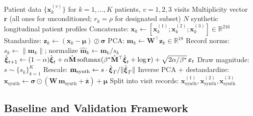 \begin{algorithm}[ht]
\caption{Multiplicity-Weighted SA for Longitudinal Patient Generation}
\label{alg:sa-pipeline}
\begin{algorithmic}[1]
\Require Patient data $\{\mathbf{x}_k^{(v)}\}$ for $k=1,\ldots,K$ patients, $v=1,2,3$ visits
\Require Multiplicity vector $\mathbf{r}$ (all ones for unconditioned; $r_k = \rho$ for designated subset)
\Ensure $N$ synthetic longitudinal patient profiles
\State Concatenate: $\mathbf{x}_k \gets [\mathbf{x}_k^{(1)}; \mathbf{x}_k^{(2)}; \mathbf{x}_k^{(3)}] \in \mathbb{R}^{216}$
\State Standardize: $\mathbf{z}_k \gets (\mathbf{x}_k - \boldsymbol{\mu}) \oslash \boldsymbol{\sigma}$
\State PCA: $\mathbf{m}_k \gets \mathbf{W}^\top \mathbf{z}_k \in \mathbb{R}^{18}$ 
\State Record norms: $s_k \gets \|\mathbf{m}_k\|$; normalize $\hat{\mathbf{m}}_k \gets \mathbf{m}_k / s_k$
\State {}
    \State {}
    \State {}
     
        \State $\hat{\boldsymbol{\xi}}_{t+1} \gets (1-\alpha)\hat{\boldsymbol{\xi}}_t + \alpha\hat{\mathbf{M}}\,\mathrm{softmax}(\beta^*\hat{\mathbf{M}}^\top\hat{\boldsymbol{\xi}}_t + \log\mathbf{r}) + \sqrt{2\alpha/\beta^*}\,\boldsymbol{\varepsilon}_t$
    \EndFor
    \State Draw magnitude: $s \sim \{s_k\}_{k=1}^K$
    \State Rescale: $\mathbf{m}_{\text{synth}} \gets s \cdot \hat{\boldsymbol{\xi}}_T / \|\hat{\boldsymbol{\xi}}_T\|$
    \State Inverse PCA + destandardize: $\mathbf{x}_{\text{synth}} \gets \boldsymbol{\sigma} \odot (\mathbf{W}\,\mathbf{m}_{\text{synth}} + \bar{\mathbf{z}}) + \boldsymbol{\mu}$
    \State Split into visit records: $\mathbf{x}_{\text{synth}}^{(1)}, \mathbf{x}_{\text{synth}}^{(2)}, \mathbf{x}_{\text{synth}}^{(3)}$
\EndFor
\end{algorithmic}
\end{algorithm}

\subsection{Baseline and Validation Framework}
\label{sec:validation}

